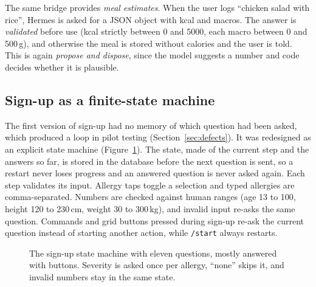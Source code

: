 \documentclass[11pt,a4paper]{article}
\begin{document}
The same bridge provides \emph{meal estimates}. When the user logs ``chicken salad with rice'', Hermes is
asked for a JSON object with kcal and macros. The answer is \emph{validated} before use (kcal strictly
between 0 and 5000, each macro between 0 and 500\,g), and otherwise the meal is stored without calories
and the user is told. This is again \emph{propose and dispose}, since the model suggests a number and
code decides whether it is plausible.

\subsection{Sign-up as a finite-state machine}\label{sec:fsm}

The first version of sign-up had no memory of which question had been asked, which produced a loop in
pilot testing (Section~\ref{sec:defects}). It was redesigned as an explicit state machine
(Figure~\ref{fig:fsm}). The state, made of the current step and the answers so far, is stored in the
database before the next question is sent, so a restart never loses progress and an answered question
is never asked again. Each step validates its input. Allergy taps toggle a selection and typed allergies
are comma-separated. Numbers are checked against human ranges (age 13 to 100, height 120 to 230\,cm,
weight 30 to 300\,kg), and invalid input re-asks the same question. Commands and grid buttons pressed
during sign-up re-ask the current question instead of starting another action, while \texttt{/start}
always restarts.

\begin{figure}[H]
\centering
{}
\caption{The sign-up state machine with eleven questions, mostly answered with buttons. Severity is
asked once per allergy, ``none'' skips it, and invalid numbers stay in the same state.}
\label{fig:fsm}
\end{figure}
\end{document}
